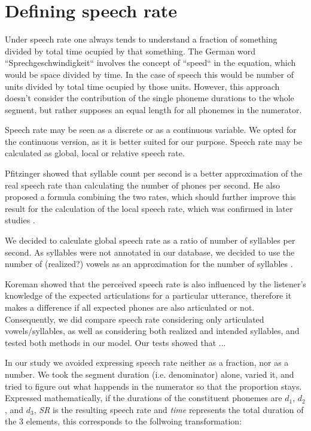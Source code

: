 \documentclass[a4paper]{scrreprt}
\begin{document}
\chapter{Defining speech rate}
Under speech rate one always tends to understand a fraction of something divided by total time ocupied by that something. The German word ``Sprechgeschwindigkeit`` involves the concept of ``speed`` in the equation, which would be space divided by time. In the case of speech this would be number of units divided by total time ocupied by those units. However, this approach doesn't consider the contribution of the single phoneme durations to the whole segment, but rather supposes an equal length for all phonemes in the numerator.

Speech rate may be seen as a discrete or as a continuous variable. We opted for the continuous version, as it is better suited for our purpose.
Speech rate may be calculated as global, local or relative speech rate.

Pfitzinger \cite{Pfitzinger1998} showed that syllable count per second is a better approximation of the real speech rate than calculating the number of phones per second. He also proposed a formula combining the two rates, which should further improve this result for the calculation of the local speech rate, which was confirmed in later studies \cite{Pfitzinger1999}.

We decided to calculate global speech rate as a ratio of number of syllables per second. As syllables were not annotated in our database, we decided to use the number of (realized?) vowels as an approximation for the number of syllables \cite{Yishan_Jiao_2015} \cite{Kohler1995}.

Koreman showed \cite{Koreman_2006} that the perceived speech rate is also influenced by the listener's knowledge of the expected articulations for a particular utterance, therefore it makes a difference if all expected phones are also articulated or not. Consequently, we did compare speech rate considering only articulated vowels/syllables, as well as considering both realized and intended syllables, and tested both methods in our model. Our tests showed that ...

In our study we avoided expressing speech rate neither as a fraction, nor as a number. We took the segment duration (i.e. denominator) alone, varied it, and tried to figure out what happends in the numerator so that the proportion stays. Expressed mathematically, if the durations of the constituent phonemes are $d_1$, $d_2$, and $d_3$, \textit{SR} is the resulting speech rate and \textit{time} represents the total duration of the 3 elements, this corresponds to the follwoing transformation:
\end{document}
